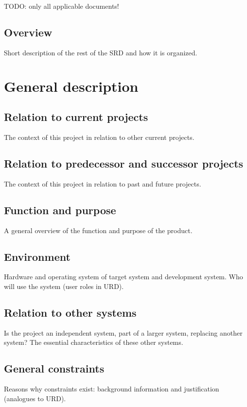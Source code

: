 
TODO: only all applicable documents! \\


\section{Overview}
Short description of the rest of the SRD and how it is organized.

\chapter{General description}
\section{Relation to current projects}
The context of this project in relation to other current projects.

\section{Relation to predecessor and successor projects}
The context of this project in relation to past and future projects.

\section{Function and purpose}
A general overview of the function and purpose of the product.

\section{Environment}
Hardware and operating system of target system and development system. Who will use the system (user roles in URD).

\section{Relation to other systems}
Is the project an independent system, part of a larger system, replacing another system? The essential characteristics of these other systems.

\section{General constraints}
Reasons why constraints exist: background information and justification (analogues to URD).

